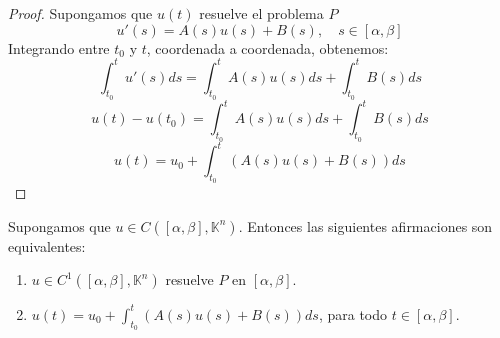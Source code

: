 \begin{proof}
    Supongamos que $u(t)$ resuelve el problema $P$
    \[
        u'(s) = A(s) u(s) + B(s), \quad s \in [\alpha, \beta]
    \]
    Integrando entre $t_0$ y $t$, coordenada a coordenada, obtenemos:
    \[
        \int_{t_0}^{t} u'(s) ds = \int_{t_0}^{t} A(s) u(s) ds + \int_{t_0}^{t} B(s) ds
    \]
    \[
        u(t) - u(t_0) = \int_{t_0}^{t} A(s) u(s) ds + \int_{t_0}^{t} B(s) ds
    \]
    \[
        u(t) = u_0 + \int_{t_0}^{t} (A(s) u(s) + B(s)) ds
    \]
\end{proof}

\begin{lema}
    Supongamos que $u \in C([\alpha, \beta], \mathbb{K}^n)$. Entonces las siguientes afirmaciones son equivalentes:
    \begin{enumerate}
        \item $u \in C^1([\alpha, \beta], \mathbb{K}^n)$ resuelve $P$ en $[\alpha, \beta]$.
        \item $u(t) = u_0 + \int_{t_0}^{t} (A(s) u(s) + B(s)) ds$, para todo $t \in [\alpha, \beta]$.
    \end{enumerate}
\end{lema}

